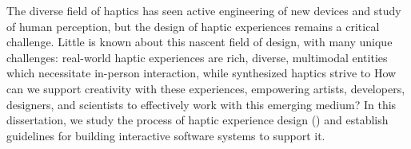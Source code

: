 The diverse field of haptics has seen active engineering of new devices and study of human perception, but the design of haptic experiences remains a critical challenge.
Little is known about this nascent field of design, with many unique challenges: real-world haptic experiences are rich, diverse, multimodal entities which necessitate in-person interaction, while
synthesized haptics strive to  %
How can we support creativity with these experiences, empowering artists, developers, designers, and scientists to effectively work with this emerging medium?
In this dissertation, we study the process of haptic experience design (\haxd) and establish guidelines for building interactive software systems to support it.
%
%
%
%
%
%
%
